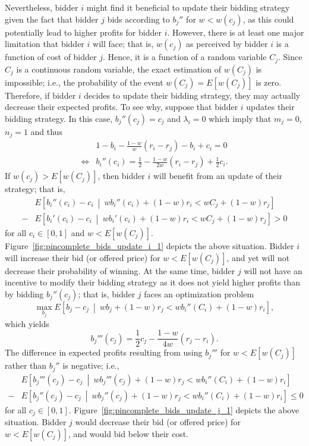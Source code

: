 Nevertheless, bidder $i$ might find it beneficial to update their bidding strategy given the fact that bidder $j$ bids according to $b_j''$ for $w<w(c_j)$, as this could potentially lead to higher profits for bidder $i$. However, there is at least one major limitation that bidder $i$ will face; that is, $w(c_j)$ as perceived by bidder $i$ is a function of cost of bidder $j$. Hence, it is a function of a random variable $C_j$. Since $C_j$ is a continuous random variable, the exact estimation of $w(C_j)$ is impossible; i.e., the probability of the event $w(C_j)=E[w(C_j)]$ is zero. Therefore, if bidder $i$ decides to update their bidding strategy, they may actually decrease their expected profits. To see why, suppose that bidder $i$ updates their bidding strategy. In this case, $b_j''(c_j) = c_j$ and $\lambda_i = 0$ which imply that $m_j = 0$, $n_j=1$ and thus
\begin{align*}
	&1 - b_i - \frac{1-w}{w}(r_i-r_j) - b_i + c_i = 0\\
	\iff &b_i''(c_i) = \frac{1}{2} - \frac{1-w}{2w}(r_i-r_j) + \frac{1}{2}c_i.
\end{align*}
If $w(c_j) > E[w(C_j)]$, then bidder $i$ will benefit from an update of their strategy; that is,
\begin{align*}
	&E\left[b_i''(c_i)-c_i \:\middle\vert\: wb_i''(c_i) + (1-w)r_i < wC_j + (1-w)r_j \right]\\
	- &E\left[b_i'(c_i)-c_i \:\middle\vert\: wb_i'(c_i) + (1-w)r_i < wC_j + (1-w)r_j \right] > 0
\end{align*}
for all $c_i\in[0,1]$ and $w < E[w(C_j)]$. Figure~\ref{fig:pincomplete_bids_update_i_1} depicts the above situation. Bidder $i$ will increase their bid (or offered price) for $w < E[w(C_j)]$, and yet will not decrease their probability of winning. At the same time, bidder $j$ will not have an incentive to modify their bidding strategy as it does not yield higher profits than by bidding $b_j''(c_j)$; that is, bidder $j$ faces an optimization problem
\begin{equation*}
	\max_{b_j} E\left[b_j - c_j \:\middle\vert\: wb_j + (1-w)r_j < wb_i''(C_i) + (1-w)r_i \right],
\end{equation*}
which yields
\begin{equation*}
	b_j'''(c_j) = \frac{1}{2}c_j - \frac{1-w}{4w}(r_j-r_i).
\end{equation*}
The difference in expected profits resulting from using $b_j'''$ for $w < E[w(C_j)]$ rather than $b_j''$ is negative; i.e.,
\begin{align*}
	&E\left[b_j'''(c_j)-c_j \:\middle\vert\: wb_j'''(c_j) + (1-w)r_j < wb_i''(C_i) + (1-w)r_i \right]\\
	- &E\left[b_j''(c_j)-c_j \:\middle\vert\: wb_j''(c_j) + (1-w)r_j < wb_i''(C_i) + (1-w)r_i \right] \le 0
\end{align*}
for all $c_j\in[0,1]$. Figure~\ref{fig:pincomplete_bids_update_j_1} depicts the above situation. Bidder $j$ would decrease their bid (or offered price) for $w < E[w(C_j)]$, and would bid below their cost.

